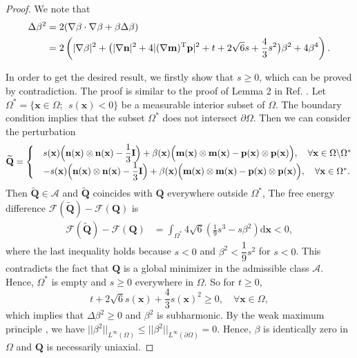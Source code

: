 \documentclass[10pt, a4paper]{article}
\newcommand\dd{\mathrm{d}}
\newcommand\n{\mathbf{n}}
\newcommand\m{\mathbf{m}}
\newcommand\p{\mathbf{p}}
\newcommand\x{\mathbf{x}}
\newcommand\Qvec{\mathbf{Q}}
\newcommand\pp{\partial}
\begin{document}
\begin{proof}
We note that
\begin{equation}\label{eq_beta2}
\begin{aligned}
\Delta \beta^2 & = 2 (\nabla \beta \cdot \nabla \beta + \beta \Delta \beta) \\
              & = 2 \left( |\nabla \beta|^2 + \bigl( |\nabla \n|^2 + 4 |(\nabla \m)^{\rm T} \p|^2 + t + 2\sqrt{6} s + \frac{4}{3}s^2 \bigr) \beta^2 +  4 \beta^4 \right). \\ %
\end{aligned}
\end{equation}

In order to get the desired result, we firstly show that $s \geq 0$, which can be proved by contradiction. The proof is similar to the proof of Lemma 2 in Ref. \cite{majumdar2010equilibrium}. Let $\Omega^{*} = \{\x \in \Omega;~~s(\x) < 0 \}$ be a measurable interior subset of $\Omega$. The boundary condition implies that the subset $\Omega^{*}$ does not intersect $\pp \Omega$. Then we can consider the perturbation
\begin{equation}
\widetilde{\Qvec} = 
\begin{cases}
& s(\x) \Bigl( \n(\x) \otimes \n(\x) - \dfrac{1}{3} \mathbf{I} \Bigr) + \beta(\x) \Bigl( \m(\x)  \otimes \m(\x)  - \p(\x) \otimes \p(\x) \Bigr), \quad \forall \x \in \Omega \backslash \Omega^{*} \\ 
& - s(\x) \Bigl( \n(\x) \otimes \n(\x) - \dfrac{1}{3} \mathbf{I} \Bigr) + \beta(\x) \Bigl( \m(\x)  \otimes \m(\x)  - \p(\x) \otimes \p(\x) \Bigr), \quad \forall \x \in \Omega^{*}. \\
\end{cases}
\end{equation}
Then $\widetilde{\Qvec} \in \mathcal{A}$ and $\widetilde{\Qvec}$ coincides with $\Qvec$ everywhere outside $\Omega^{*}$, The free energy difference $\mathcal{F}(\widetilde{\Qvec}) - \mathcal{F}(\Qvec)$ is 
\begin{equation}
\begin{aligned}
\mathcal{F}(\widetilde{\Qvec}) - \mathcal{F}(\Qvec) &= \int_{\Omega^{*}} 4\sqrt{6}(\frac{1}{9} s^3 - s \beta^2) \dd \x < 0,
\end{aligned}
\end{equation}
where the last inequality holds because $s < 0$ and $\beta^2 < \dfrac{1}{9} s^2$ for $s < 0$. This contradicts the fact that $\Qvec$ is a global minimizer in the admissible class $\mathcal{A}$. Hence, $\Omega^{*}$ is empty and $s \geq 0$ everywhere in $\Omega$. So for $t \geq 0$,
\begin{equation}
t + 2\sqrt{6} s(\x) + \frac{4}{3}s(\x)^2 \geq 0, \quad \forall \x \in \Omega, 
\end{equation}
 which implies that $\Delta \beta^2 \geq 0$ and $\beta^2$ is subharmonic. 
By the weak maximum principle \cite{han2011basic}, we have $||\beta^2||_{L^{\infty} (\Omega)} \leq ||\beta^2||_{L^{\infty} (\pp \Omega)} = 0$. Hence, $\beta$ is identically zero in $\Omega$ and $\Qvec$ is necessarily uniaxial. %

\end{proof}
\end{document}
